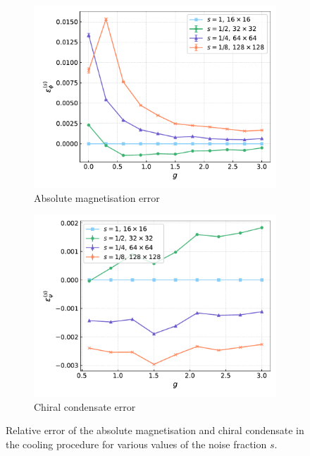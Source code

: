 \begin{figure}[htp]
    \centering
    \begin{subfigure}[b]{0.45\textwidth}
        \includegraphics[width=\textwidth]{figures/cooling/yukawa_scan/deviation.pdf}
        \caption{Absolute magnetisation error}
    \end{subfigure}
    \begin{subfigure}[b]{0.45\textwidth}
        \includegraphics[width=\textwidth]{figures/cooling/yukawa_scan/deviation_cond.pdf}
        \caption{Chiral condensate error}
    \end{subfigure}
    \caption[Relative error in the cooling procedure at tree level.]{Relative error of the absolute magnetisation and chiral condensate in the cooling procedure for various values of the noise fraction $s$.}
    \label{fig:cooling_deviation_yukawa}
\end{figure} \\
